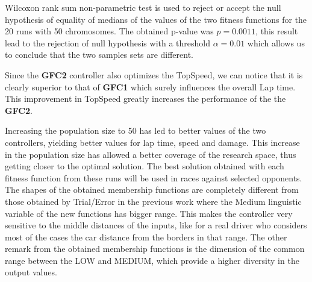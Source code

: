 \documentclass[conference]{IEEEtran}
\begin{document}
\begin{table}[ht]
{{\begin{tabular}{|c||c|c|c|c||c|c|c|c|}
			\end{tabular}
		}\label{tab:runsresults}
	}
\end{table}
Wilcoxon rank sum non-parametric test is used to reject or accept the
null hypothesis of equality of medians of the values of the two
fitness functions for the 20 runs with 50 chromosomes. The obtained
p-value was $p =  0.0011$, this result lead to the rejection of null
hypothesis with a threshold $\alpha=0.01$ which allows us to conclude
that the two samples sets are different. 

Since the \textbf{GFC2} controller also optimizes the TopSpeed, we can
notice that it is clearly superior to that of \textbf{GFC1} which
surely influences the overall Lap time. This improvement in TopSpeed
greatly increases the performance of the the \textbf{GFC2}.

Increasing the population size to 50  has led to better values of the
two controllers, yielding better values for lap time, speed and
damage. This increase in the population size has allowed a better
coverage of the research space, thus getting closer to the optimal
solution.  
The best solution obtained with each fitness function from these runs
will be used in races against selected opponents. 
%
The shapes of the obtained membership functions are completely different from
those obtained by Trial/Error in the previous work \cite{evo17}
where the Medium linguistic variable of the new functions has bigger
range. This makes the controller very sensitive to the middle
distances of the inputs, like for a real driver who considers most of
the cases the car distance from the borders in that range. 
The other remark from the obtained  membership functions is the
dimension of the common range between the LOW and MEDIUM, which
provide a higher diversity in the output values. 
\end{document}
